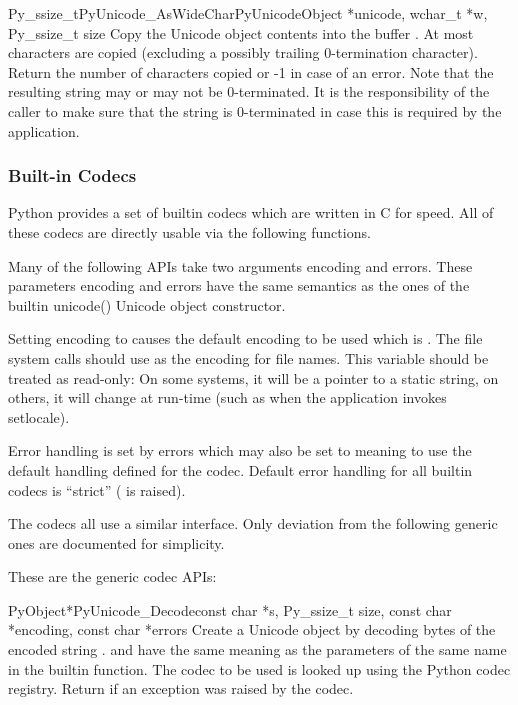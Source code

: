 \begin{cfuncdesc}{Py_ssize_t}{PyUnicode_AsWideChar}{PyUnicodeObject *unicode,
                                             wchar_t *w,
                                             Py_ssize_t size}
  Copy the Unicode object contents into the  buffer
  .  At most   characters are copied
  (excluding a possibly trailing 0-termination character).  Return
  the number of  characters copied or -1 in case of an
  error.  Note that the resulting  string may or may
  not be 0-terminated.  It is the responsibility of the caller to make
  sure that the  string is 0-terminated in case this is
  required by the application.
\end{cfuncdesc}


\subsubsection{Built-in Codecs \label{builtinCodecs}}

Python provides a set of builtin codecs which are written in C
for speed. All of these codecs are directly usable via the
following functions.

Many of the following APIs take two arguments encoding and
errors. These parameters encoding and errors have the same semantics
as the ones of the builtin unicode() Unicode object constructor.

Setting encoding to \NULL{} causes the default encoding to be used
which is \ASCII.  The file system calls should use
 as the encoding for file
names. This variable should be treated as read-only: On some systems,
it will be a pointer to a static string, on others, it will change at
run-time (such as when the application invokes setlocale).

Error handling is set by errors which may also be set to \NULL{}
meaning to use the default handling defined for the codec.  Default
error handling for all builtin codecs is ``strict''
( is raised).

The codecs all use a similar interface.  Only deviation from the
following generic ones are documented for simplicity.


These are the generic codec APIs:

\begin{cfuncdesc}{PyObject*}{PyUnicode_Decode}{const char *s,
                                               Py_ssize_t size,
                                               const char *encoding,
                                               const char *errors}
  Create a Unicode object by decoding  bytes of the encoded
  string .   and  have the same
  meaning as the parameters of the same name in the
   builtin function.  The codec to be used is
  looked up using the Python codec registry.  Return \NULL{} if an
  exception was raised by the codec.
\end{cfuncdesc}

